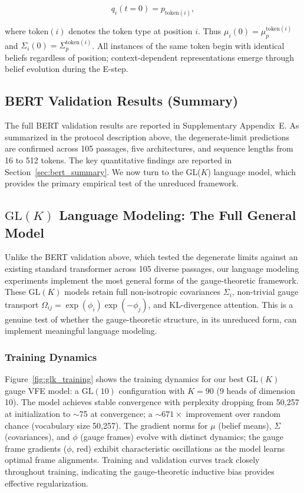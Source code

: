\documentclass[twoside,11pt]{article}
\begin{document}
\begin{equation}
q_i(t=0) = p_{\text{token}(i)},
\end{equation}

where $\text{token}(i)$ denotes the token type at position $i$. Thus $\mu_i(0) = \mu_p^{\text{token}(i)}$ and $\Sigma_i(0) = \Sigma_p^{\text{token}(i)}$. All instances of the same token begin with identical beliefs regardless of position; context-dependent representations emerge through belief evolution during the E-step.

\subsection{BERT Validation Results (Summary)}

The full BERT validation results are reported in Supplementary Appendix~E. As summarized in the protocol description above, the degenerate-limit predictions are confirmed across 105 passages, five architectures, and sequence lengths from 16 to 512 tokens. The key quantitative findings are reported in Section~\ref{sec:bert_summary}. We now turn to the GL($K$) language model, which provides the primary empirical test of the unreduced framework.

\subsection{$\mathrm{GL}(K)$ Language Modeling: The Full General Model}
\label{sec:glk_lm}

Unlike the BERT validation above, which tested the degenerate limits against an existing standard transformer across 105 diverse passages, our language modeling experiments implement the most general forms of the gauge-theoretic framework. These $\mathrm{GL}(K)$ models retain full non-isotropic covariances $\Sigma_i$, non-trivial gauge transport $\Omega_{ij} = \exp(\phi_i)\exp(-\phi_j)$, and KL-divergence attention. This is a genuine test of whether the gauge-theoretic structure, in its unreduced form, can implement meaningful language modeling.

\subsubsection{Training Dynamics}

Figure~\ref{fig:glk_training} shows the training dynamics for our best $\mathrm{GL}(K)$ gauge VFE model: a $\mathrm{GL}(10)$ configuration with $K=90$ (9 heads of dimension 10). The model achieves stable convergence with perplexity dropping from 50,257 at initialization to $\sim$75 at convergence; a ${\sim}671\times$ improvement over random chance (vocabulary size 50{,}257). The gradient norms for $\mu$ (belief means), $\Sigma$ (covariances), and $\phi$ (gauge frames) evolve with distinct dynamics; the gauge frame gradients ($\phi$, red) exhibit characteristic oscillations as the model learns optimal frame alignments. Training and validation curves track closely throughout training, indicating the gauge-theoretic inductive bias provides effective regularization.
\end{document}
